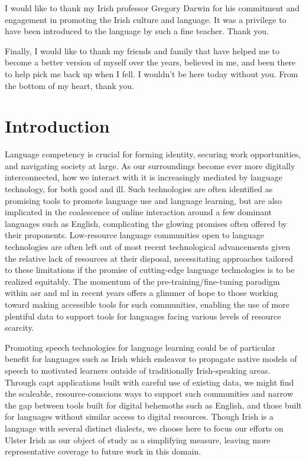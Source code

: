 \documentclass[thesis]{cluu}
\begin{document}
I would like to thank my Irish professor Gregory Darwin for his commitment and engagement in promoting the Irish culture and language. It was a privilege to have been introduced to the language by such a fine teacher. Thank you.
\bigskip

Finally, I would like to thank my friends and family that have helped me to become a better version of myself over the years, believed in me, and been there to help pick me back up when I fell. I wouldn't be here today without you. From the bottom of my heart, thank you.

\printglossary[type=\acronymtype]

\printglossary

\chapter{Introduction}
Language competency is crucial for forming identity, securing work opportunities, and navigating society at large. As our surroundings become ever more digitally interconnected, how we interact with it is increasingly mediated by language technology, for both good and ill. Such technologies are often identified as promising tools to promote language use and language learning, but are also implicated in the coalescence of online interaction around a few dominant languages such as English, complicating the glowing promises often offered by their proponents. Low-resource language communities open to language technologies are often left out of most recent technological advancements given the relative lack of resources at their disposal, necessitating approaches tailored to these limitations if the promise of cutting-edge language technologies is to be realized equitably. The momentum of the pre-training/fine-tuning paradigm within \acrfull{asr} and \gls{ml} in recent years offers a glimmer of hope to those working toward making accessible tools for such communities, enabling the use of more plentiful data to support tools for languages facing various levels of resource scarcity.

Promoting speech technologies for language learning could be of particular benefit for languages such as Irish which endeavor to propagate native models of speech to motivated learners outside of traditionally Irish-speaking areas. Through \gls{capt} applications built with careful use of existing data, we might find the scaleable, resource-conscious ways to support such communities and narrow the gap between tools built for digital behemoths such as English, and those built for languages without similar access to digital resources. Though Irish is a language with several distinct dialects, we choose here to focus our efforts on Ulster Irish as our object of study as a simplifying measure, leaving more representative coverage to future work in this domain.
\end{document}
